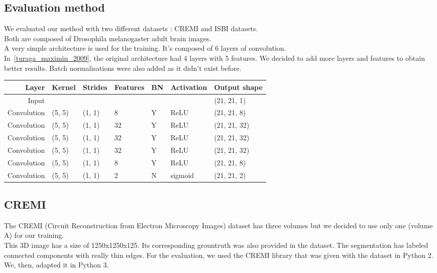 \subsection{Evaluation method}
We evaluated our method with two different datasets : CREMI and ISBI datasets.\\
Both are composed of Drosophila melanogaster adult brain images.\\

A very simple architecture is used for the training.
It's composed of 6 layers of convolution.\\
In~\ref{turaga_maximin_2009}, the original architecture had 4 layers with 5 features. We decided to add more layers and features to obtain better results. 
Batch normalisations were also added as it didn't exist before.\\

\begin{center}
	\begin{tabular}{rllllll}\toprule
		Layer & Kernel & Strides & Features & BN &  Activation & Output shape \\
		\midrule
		Input  &  &  & & & & (21, 21, 1)  \\
		Convolution & (5, 5) & (1, 1) & 8 & Y & ReLU  & (21, 21, 8)  \\
		Convolution & (5, 5) & (1, 1) & 32 & Y & ReLU  & (21, 21, 32)  \\
		Convolution & (5, 5) & (1, 1) & 32 & Y & ReLU  & (21, 21, 32)  \\
		Convolution & (5, 5) & (1, 1) & 32 & Y & ReLU  & (21, 21, 32)  \\
		Convolution & (5, 5) & (1, 1) & 8 & Y & ReLU  & (21, 21, 8)  \\
		Convolution & (5, 5) & (1, 1) & 2 & N & sigmoid  & (21, 21, 2)  \\
		\bottomrule
	\end{tabular}
\end{center}

\subsection{CREMI}
The CREMI (Circuit Reconstruction from Electron Microscopy Images) dataset has three volumes but we decided to use only one (volume A) for our training.\\
This 3D image has a size of 1250x1250x125. Its corresponding grountruth was also provided in the dataset. 
The segmentation has labeled connected components with really thin edges.
For the evaluation, we used the CREMI library that was given with the dataset in Python 2. We, then, adapted it in Python 3.\\


